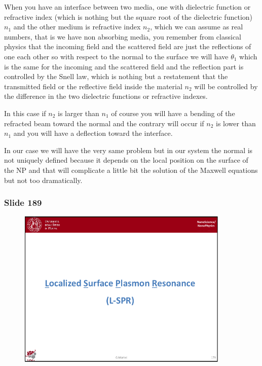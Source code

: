 \documentclass[../main/main.tex]{subfiles}
\begin{document}
When you have an interface between two media, one with dielectric function or refractive index (which is nothing but the square root of the dielectric function) $n_1$ and the other medium is refractive index $n_2$, which we can assume as real numbers, that is we have non absorbing media, you remember from classical physics that the incoming field and the scattered field are just the reflections of one each other so with respect to the normal to the surface we will have $\theta_1$ which is the same for the incoming and the scattered field and the reflection part is controlled by the Snell law, which is nothing but a restatement that the transmitted field or the reflective field inside the material $n_2$ will be controlled by the difference in the two dielectric functions or refractive indexes.

In this case if $n_2$ is larger than $n_1$ of course you will have a bending of the refracted beam toward the normal and the contrary will occur if $n_2$ is lower than $n_1$ and you will have a deflection toward the interface. 

In our case we will have the very same problem but in our system the normal is not uniquely defined because it depends on the local position on the surface of the NP and that will complicate a little bit the solution of the Maxwell equations but not too dramatically.

\newpage

\subsubsection{Slide 189}

\begin{figure}[h!]
\centering
\includegraphics[page=11,width=0.9\textwidth]{../lessons/pdf_file/11_lesson.pdf}
\end{figure}
\end{document}
